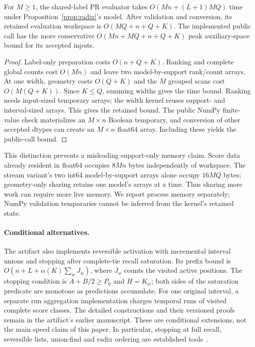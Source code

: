 \begin{proposition}
For $M\ge1$, the shared-label PR evaluator takes
$O(Mn+(L+1)MQ)$ time under Proposition~\ref{prop:radix}'s model.
After validation and conversion, its retained evaluation workspace is
$O(MQ+n+Q+K)$. The implemented public call has the more conservative
$O(Mn+MQ+n+Q+K)$ peak auxiliary-space bound for its accepted inputs.
\end{proposition}
\begin{proof}
Label-only preparation costs $O(n+Q+K)$. Ranking and complete global counts cost
$O(Mn)$ and leave two model-by-support rank/count arrays. At one width, geometry
costs $O(Q+K)$ and the $M$ grouped scans cost $O(M(Q+K))$. Since $K\le Q$, summing
widths gives the time bound. Ranking needs input-sized temporary arrays; the
width kernel reuses support- and interval-sized arrays. This gives the retained
bound. The public NumPy finite-value check materializes an $M\times n$ Boolean
temporary, and conversion of other accepted dtypes can create an $M\times n$
float64 array. Including these yields the public-call bound.
\end{proof}

This distinction prevents a misleading support-only memory claim. Score data
already resident in float64 occupies $8Mn$ bytes independently of workspace.
The stream variant's two int64 model-by-support arrays alone occupy $16MQ$
bytes; geometry-only sharing retains one model's arrays at a time. Thus sharing
more work can require more live memory. We report process memory separately;
NumPy validation temporaries cannot be inferred from the kernel's retained state.

\paragraph{Conditional alternatives.}
The artifact also implements reversible activation with incremental interval
unions and stopping after complete-tie recall saturation. Its prefix bound is
$O(n+L+\alpha(K)\sum_wJ_w)$, where $J_w$ counts the visited active positions.
The stopping condition is $A+B/2\ge P_0$ and $H=K_w$; both sides of the
saturation predicate are monotone as predictions accumulate. For one original
interval, a separate run aggregation implementation charges temporal runs of
visited complete score classes. The detailed constructions and their versioned
proofs remain in the artifact's earlier manuscript. These are conditional
extensions, not the main speed claim of this paper. In particular, stopping
at full recall, reversible lists, union-find and radix ordering are established
tools~\cite{sklearn102,knuth2000,tarjan1984,demaine2011radix,herf2001radix}.

